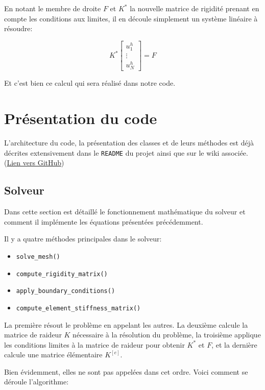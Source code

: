 \documentclass{article}
\begin{document}
En notant le membre de droite $F$ et $K^*$ la nouvelle
matrice de rigidité prenant en compte les conditions aux limites,
il en découle simplement un système linéaire à résoudre:

\begin{equation}
    K^*
    \begin{bmatrix}
        u^h_1 \\ \vdots \\ u^h_N
    \end{bmatrix}
    = F
\end{equation}

Et c'est bien ce calcul qui sera réalisé dans notre code.

\newpage

\section{Présentation du code}

L'architecture du code, la présentation des classes et de leurs
méthodes est déjà décrites extensivement dans le \verb|README|
du projet ainsi que sur le wiki associée.
(\href{https://github.com/LuciferC-137/FiniteElementElec}{Lien vers GitHub})

\subsection{Solveur}

Dans cette section est détaillé le fonctionnement
mathématique du solveur et comment il implémente les équations
présentées précédemment.

Il y a quatre méthodes principales dans le solveur:

\begin{itemize}
    \item \verb|solve_mesh()|
    \item \verb|compute_rigidity_matrix()|
    \item \verb|apply_boundary_conditions()|
    \item \verb|compute_element_stiffness_matrix()|
\end{itemize}

La première résout le problème en appelant les autres.
La deuxième calcule la matrice de raideur $K$ nécessaire à la
résolution du problème, la troisième applique les conditions
limites à la matrice de raideur pour obtenir $K^*$ et $F$, et la dernière calcule
une matrice élémentaire $K^{[e]}$.

Bien évidemment, elles ne sont pas appelées dans cet ordre. Voici
comment se déroule l'algorithme:
\end{document}
